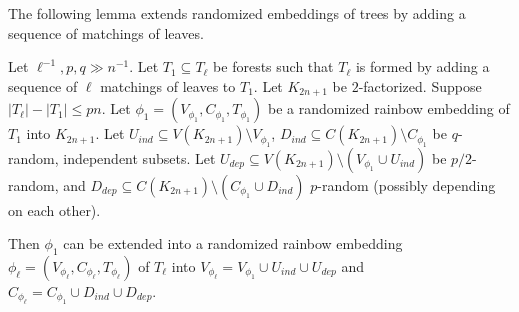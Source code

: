 The following lemma extends randomized embeddings of trees by adding a sequence of matchings of leaves.
\begin{lemma}\label{Lemma_extending_with_matchings}
Let $\ell^{-1},p, q\gg  n^{-1}$.
Let $T_1\subseteq T_{\ell}$ be forests such that $T_{\ell}$ is formed by adding a sequence of $\ell$ matchings of leaves to $T_1$. Let  $K_{2n+1}$ be $2$-factorized.  Suppose $|T_{\ell}|-|T_1|\leq pn$.
Let $\phi_1=(V_{\phi_1}, C_{\phi_1}, T_{\phi_1})$ be a  randomized rainbow embedding of $T_1$ into $K_{2n+1}$.  Let $U_{ind}\subseteq V(K_{2n+1})\setminus V_{\phi_1}$, $D_{ind}\subseteq C(K_{2n+1})\setminus C_{\phi_1}$ be $q$-random, independent subsets.  Let $U_{dep}\subseteq V(K_{2n+1})\setminus (V_{\phi_1}\cup U_{ind})$ be $p/2$-random, and $D_{dep}\subseteq C(K_{2n+1})\setminus(C_{\phi_1}\cup D_{ind})$  $p$-random (possibly depending on each other).

Then $\phi_1$ can be extended into a randomized rainbow embedding $\phi_{\ell}=(V_{\phi_{\ell}}, C_{\phi_{\ell}}, T_{\phi_{\ell}})$ of $T_{\ell}$ into $V_{\phi_{\ell}}=V_{\phi_1}\cup U_{ind}\cup U_{dep}$ and $C_{\phi_{\ell}}=C_{\phi_1}\cup D_{ind}\cup D_{dep}$.
\end{lemma}
